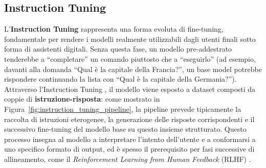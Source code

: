 \subsection{Instruction Tuning}

L'\textbf{Instruction Tuning} rappresenta una forma evoluta di fine-tuning, fondamentale per rendere i modelli realmente utilizzabili dagli utenti finali sotto forma di assistenti digitali. Senza questa fase, un modello pre-addestrato tenderebbe a ``completare'' un comando piuttosto che a ``eseguirlo'' (ad esempio, davanti alla domanda ``Qual è la capitale della Francia?'', un base model potrebbe rispondere continuando la lista con ``Qual è la capitale della Germania?''). Attraverso l'Instruction Tuning \cite{wei2022finetuned,wang2022self}, il modello viene esposto a dataset composti da coppie di \textbf{istruzione-risposta}: come mostrato in Figura~\ref{fig:instruction_tuning_pipeline}, la pipeline prevede tipicamente la raccolta di istruzioni eterogenee, la generazione delle risposte corrispondenti e il successivo fine-tuning del modello base su questo insieme strutturato. Questo processo insegna al modello a interpretare l'intento dell'utente e a conformarsi a uno specifico formato di output, ed è spesso il prerequisito per fasi successive di allineamento, come il \textit{Reinforcement Learning from Human Feedback} (RLHF) \cite{ouyang2022training}.


